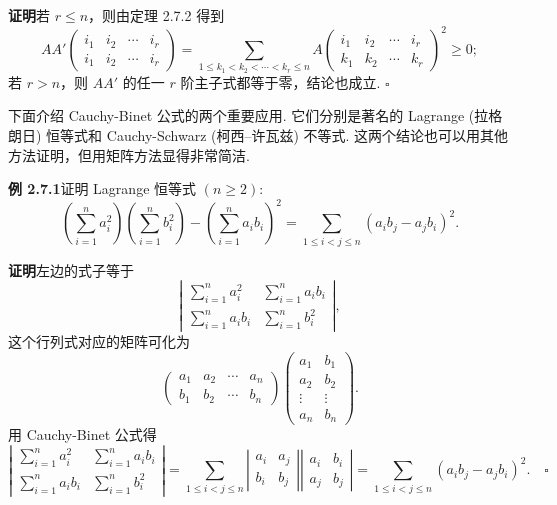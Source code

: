 \documentclass[UTF8, 12pt, fontset=fandol, oneside]{ctexart}
\begin{document}
\noindent\textbf{证明}\quad 若 $r\leq n$，则由定理 2.7.2 得到
\[
AA'\left(\begin{array}{cccc}
i_1 & i_2 & \cdots & i_r\\
i_1 & i_2 & \cdots & i_r
\end{array}\right)=
\sum_{1\leq k_1<k_2<\cdots<k_r\leq n}
A\left(\begin{array}{cccc}
i_1 & i_2 & \cdots & i_r\\
k_1 & k_2 & \cdots & k_r
\end{array}\right)^2\geq 0;
\]
若 $r>n$，则 $AA'$ 的任一 $r$ 阶主子式都等于零，结论也成立. $\square$

下面介绍 Cauchy-Binet 公式的两个重要应用. 它们分别是著名的 Lagrange (拉格朗日) 恒等式和 Cauchy-Schwarz (柯西--许瓦兹) 不等式. 这两个结论也可以用其他方法证明，但用矩阵方法显得非常简洁.

\noindent\textbf{例 2.7.1}\quad 证明 Lagrange 恒等式 $(n\geq 2)$:
\[
\left(\sum_{i=1}^n a_i^2\right)\left(\sum_{i=1}^n b_i^2\right)-\left(\sum_{i=1}^n a_ib_i\right)^2
=\sum_{1\leq i<j\leq n}(a_ib_j-a_jb_i)^2.
\]

\noindent\textbf{证明}\quad 左边的式子等于
\[
\left|\begin{array}{cc}
\sum\limits_{i=1}^n a_i^2 & \sum\limits_{i=1}^n a_ib_i\\
\sum\limits_{i=1}^n a_ib_i & \sum\limits_{i=1}^n b_i^2
\end{array}\right|,
\]
这个行列式对应的矩阵可化为
\[
\left(\begin{array}{cccc}
a_1 & a_2 & \cdots & a_n\\
b_1 & b_2 & \cdots & b_n
\end{array}\right)
\left(\begin{array}{cc}
a_1 & b_1\\
a_2 & b_2\\
\vdots & \vdots\\
a_n & b_n
\end{array}\right).
\]
用 Cauchy-Binet 公式得
\[
\left|\begin{array}{cc}
\sum\limits_{i=1}^n a_i^2 & \sum\limits_{i=1}^n a_ib_i\\
\sum\limits_{i=1}^n a_ib_i & \sum\limits_{i=1}^n b_i^2
\end{array}\right|
=\sum_{1\leq i<j\leq n}
\left|\begin{array}{cc}
a_i & a_j\\
b_i & b_j
\end{array}\right|
\left|\begin{array}{cc}
a_i & b_i\\
a_j & b_j
\end{array}\right|
=\sum_{1\leq i<j\leq n}(a_ib_j-a_jb_i)^2. \quad \square
\]
\end{document}
